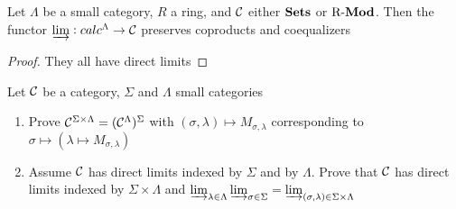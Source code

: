 \documentclass[11pt]{article}
\begin{document}
\begin{corollary}[]
\label{6.15}
Let \(\Lambda\) be a small category, \(R\) a ring, and \(\mathcal{C}\) either \(\operatorname{\textbf{Sets}}\) or
\(\operatorname{R-\textbf{Mod}}\). Then the functor \(\varinjlim:calc^\Lambda\to\mathcal{C}\) preserves
coproducts and coequalizers
\end{corollary}

\begin{proof}
They all have direct limits
\end{proof}

\begin{exercise}
\label{6.16}
\label{todo2}
Let \(\mathcal{C}\) be a category, \(\Sigma\) and \(\Lambda\) small categories
\begin{enumerate}
\item Prove \(\mathcal{C}^{\Sigma\times\Lambda}=(\mathcal{C}^\Lambda)^\Sigma\) with \((\sigma,\lambda)\mapsto
      M_{\sigma,\lambda}\) corresponding to \(\sigma\mapsto(\lambda\mapsto M_{\sigma,\lambda})\)
\item Assume \(\mathcal{C}\) has direct limits indexed by \(\Sigma\) and by \(\Lambda\). Prove that
\(\mathcal{C}\) has direct limits indexed by \(\Sigma\times\Lambda\) and \(\varinjlim_{\lambda\in\Lambda}\varinjlim_{\sigma\in\Sigma}=\varinjlim_{(\sigma,\lambda)\in\Sigma\times\Lambda}\)
\end{enumerate}
\end{exercise}
\end{document}
